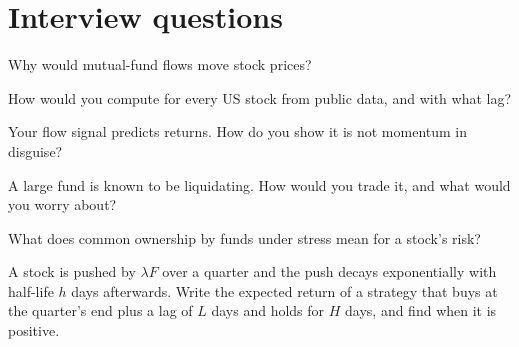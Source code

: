 \section{Interview questions}

\begin{interviewq}\label{iq:s1:flows:1}
Why would mutual-fund flows move stock prices?
\end{interviewq}

\begin{interviewq}\label{iq:s1:flows:2}
How would you compute  for every US stock from public data, and with what lag?
\end{interviewq}

\begin{interviewq}\label{iq:s1:flows:3}
Your flow signal predicts returns. How do you show it is not momentum in disguise?
\end{interviewq}

\begin{interviewq}\label{iq:s1:flows:4}
A large fund is known to be liquidating. How would you trade it, and what would you worry about?
\end{interviewq}

\begin{interviewq}\label{iq:s1:flows:5}
What does common ownership by funds under stress mean for a stock's risk?
\end{interviewq}

\begin{interviewq}\label{iq:s1:flows:6}
A stock is pushed by $\lambda F$ over a quarter and the push decays exponentially with half-life $h$ days afterwards. Write the expected return of a strategy
that buys at the quarter's end plus a lag of $L$ days and holds for $H$ days, and find when it is positive.
\end{interviewq}
